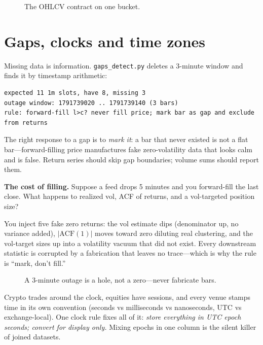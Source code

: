 \begin{figure}[htbp]\centering

\caption{The OHLCV contract on one bucket.}
\label{fig:resample}
\end{figure}

\section{Gaps, clocks and time zones}\label{sec:gaps}

Missing data is information. \texttt{gaps\_detect.py} deletes a 3-minute window and finds it
by timestamp arithmetic:
\begin{lstlisting}[numbers=none]
expected 11 1m slots, have 8, missing 3
outage window: 1791739020 .. 1791739140 (3 bars)
rule: forward-fill l>c? never fill price; mark bar as gap and exclude from returns
\end{lstlisting}
The right response to a gap is to \emph{mark it}: a bar that never existed is not a flat
bar---forward-filling price manufactures fake zero-volatility data that looks calm and is
false. Return series should skip gap boundaries; volume sums should report them.

\begin{example}\label{ex:gapfill}
\textbf{The cost of filling.} Suppose a feed drops 5 minutes and you forward-fill the last
close. What happens to realized vol, ACF of returns, and a vol-targeted position size?
\begin{solution}
You inject five fake zero returns: the vol estimate dips (denominator up, no variance added),
$|\mathrm{ACF}(1)|$ moves toward zero diluting real clustering, and the vol-target sizes up
into a volatility vacuum that did not exist. Every downstream statistic is corrupted by a
fabrication that leaves no trace---which is why the rule is ``mark, don't fill.''
\end{solution}
\end{example}

\begin{figure}[htbp]\centering

\caption{A 3-minute outage is a hole, not a zero---never fabricate bars.}
\label{fig:gap}
\end{figure}

Crypto trades around the clock, equities have sessions, and every venue stamps time in its
own convention (seconds vs milliseconds vs nanoseconds, UTC vs exchange-local). One clock
rule fixes all of it: \emph{store everything in UTC epoch seconds; convert for display only.}
Mixing epochs in one column is the silent killer of joined datasets.

